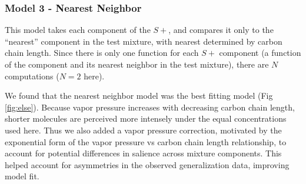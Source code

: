 \subsubsection{Model 3 - Nearest Neighbor}
This model takes each component of the $S+$, and compares it only to the ``nearest'' component in the test mixture, with nearest determined by carbon chain length.  Since there is only one function for each $S+$ component (a function of the component and its nearest neighbor in the test mixture), there are $N$ computations ($N=2$ here).  

We found that the nearest neighbor model was the best fitting model (Fig \ref{fig:else}).  Because vapor pressure increases with decreasing carbon chain length, shorter molecules are perceived more intensely under the equal concentrations used here.  Thus we also added a vapor pressure correction, motivated by the exponential form of the vapor pressure vs carbon chain length relationship, to account for potential differences in salience across mixture components.  This helped account for asymmetries in the observed generalization data, improving model fit.  